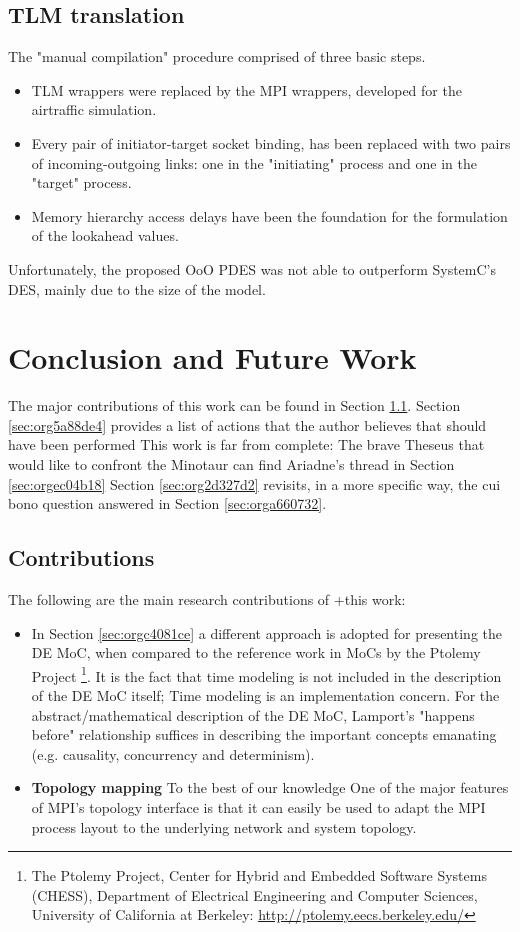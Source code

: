 \documentclass[11pt]{article}
\begin{document}
\subsection{TLM translation}
\label{sec:org6c9cc76}
The "manual compilation" procedure comprised of three basic steps.
\begin{itemize}
\item TLM wrappers were replaced by the MPI wrappers, developed for the airtraffic simulation.
\item Every pair of initiator-target socket binding,  has been replaced with two pairs of incoming-outgoing links: one in the "initiating" process and one in the "target" process.
\item Memory hierarchy access delays have been the foundation for the formulation of the lookahead values.
\end{itemize}
Unfortunately, the proposed OoO PDES was not able to outperform SystemC's DES, mainly due to the size of the model.
\clearpage

\section{Conclusion and Future Work}
\label{sec:orgaacb190}
The major contributions of this work can be found in Section \ref{sec:org52c4582}.
Section \ref{sec:org5a88de4} provides a list of actions that the author believes that should have been performed
This work is far from complete: The brave Theseus that would like to confront the Minotaur can find Ariadne's thread in Section \ref{sec:orgec04b18}
Section \ref{sec:org2d327d2} revisits, in a more specific way, the cui bono question answered in Section \ref{sec:orga660732}.

\subsection{Contributions}
\label{sec:org52c4582}
The following are the main research contributions of +this work:
\begin{itemize}
\item In Section \ref{sec:orgc4081ce} a different approach is adopted for presenting the DE MoC, 
when compared to the reference work in MoCs by the Ptolemy Project \footnote{The Ptolemy Project, Center for Hybrid and Embedded Software Systems (CHESS),
Department of Electrical Engineering and Computer Sciences, University of California at Berkeley: \url{http://ptolemy.eecs.berkeley.edu/}}.
It is the fact that time modeling is not included in the description of the DE MoC itself; 
Time modeling is an implementation concern.
For the abstract/mathematical description of the DE MoC, Lamport's "happens before" relationship \cite{Lamport1978} suffices in describing 
the important concepts emanating (e.g. causality, concurrency and determinism).
\item \textbf{Topology mapping} To the best of our knowledge
One of the major features of MPI's topology interface is that it can easily be used to adapt the MPI process layout to the underlying network and system topology.
\end{itemize}
\end{document}
